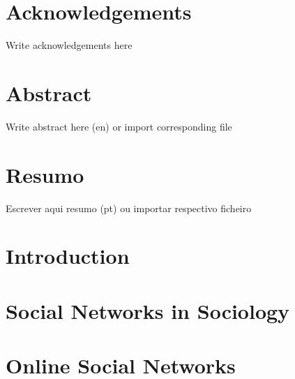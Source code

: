 \documentclass[
  oneside,
  11pt, a4paper,
  footinclude=true,
  headinclude=true,
  cleardoublepage=empty
]{scrbook}
\author{Jorge Caldas}
\date{\myear}
\begin{document}
	\umfrontcover
	\umtitlepage
	
	\chapter*{Acknowledgements}
	Write acknowledgements here

	\chapter*{Abstract}
	Write abstract here (en) or import corresponding file
	
	\cleardoublepage
	\chapter*{Resumo}
	Escrever aqui resumo (pt) ou importar respectivo ficheiro
	
	\tableofcontents
	
	
	\listoffigures
	\listoftables
	\printglossary[type=\acronymtype]
	\clearpage
	\thispagestyle{empty}
	
	
	\chapter{Introduction}
	
	
	
	\chapter{Social Networks in Sociology}
	
	
	
	\chapter{Online Social Networks}
	
	
\end{document}
